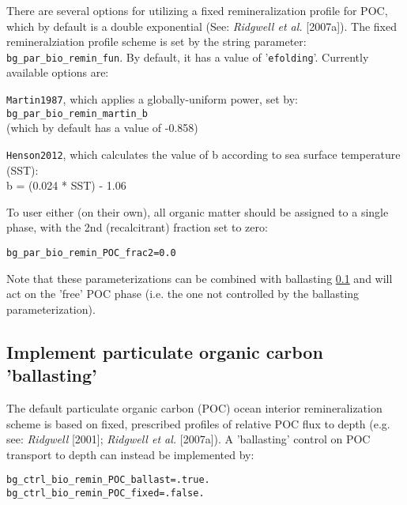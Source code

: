 \documentclass[10pt,twoside]{article}
\begin{document}
There are several options for utilizing a fixed remineralization profile for POC, which by default is a double exponential (See: \textit{Ridgwell et al.} [2007a]).
The fixed remineralziation profile scheme is set by the string parameter: \texttt{bg\_par\_bio\_remin\_fun}. By default, it has a value of '\texttt{efolding}'. Currently available options are:

\begin{compactitem}
        \item
  \texttt{Martin1987}, which applies a globally-uniform power, set by:
  \\ \texttt{bg\_par\_bio\_remin\_martin\_b}
  \\(which by default has a value of -0.858)
        \item
  \texttt{Henson2012}, which calculates the value of b according to sea surface temperature (SST):
  \\b = (0.024 * SST) - 1.06
\end{compactitem}

To user either (on their own), all organic matter should be assigned to a single phase, with the 2nd (recalcitrant) fraction set to zero:
\vspace{-10pt}\begin{verbatim}
bg_par_bio_remin_POC_frac2=0.0
\end{verbatim}\vspace{-10pt}

Note that these parameterizations can be combined with ballasting \ref{ballasting} and will act on the 'free' POC phase (i.e. the one not controlled by the ballasting parameterization).


\subsection{Implement particulate organic carbon 'ballasting'}\label{ballasting}

The default particulate organic carbon (POC) ocean interior remineralization scheme is based on fixed, prescribed profiles of relative POC flux to depth (e.g. see: \textit{Ridgwell} [2001]; \textit{Ridgwell et al.} [2007a]). A 'ballasting' control on POC transport to depth can instead be implemented by:
\vspace{-10pt}\begin{verbatim}
bg_ctrl_bio_remin_POC_ballast=.true.
bg_ctrl_bio_remin_POC_fixed=.false.
\end{verbatim}\vspace{-10pt}
\end{document}

